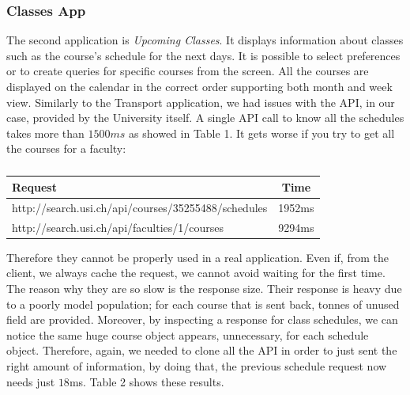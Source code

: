 \documentclass[]{usiinfbachelorproject}
\begin{document}
\subsubsection{Classes App}
The second application is \emph{Upcoming Classes}. It displays information about classes such as the course's schedule for the next days. It is possible to select preferences or to create queries for specific courses from the screen. All the courses are displayed on the calendar in the correct order supporting both month and week view.
Similarly to the Transport application, we had issues with the API, in our case, provided by the University itself. A single API call to know all the schedules takes more than $1500ms$ as showed in Table 1. It gets worse if you try to get all the courses for a faculty:
\begin{table}[h]
\centering
\begin{tabular}{|l|c|}
\hline
Request & Time \\\hline
http://search.usi.ch/api/courses/35255488/schedules & 1952ms \\
http://search.usi.ch/api/faculties/1/courses & 9294ms\\\hline
\end{tabular}
\caption{}
\label{table:usi_request}
\end{table}
Therefore they cannot be properly used in a real application. Even if, from the client, we always cache the request, we cannot avoid waiting for the first time. The reason why they are so slow is the response size. Their response is heavy due to a poorly model population; for each course that is sent back, tonnes of unused field are provided. Moreover, by inspecting a response for class schedules, we can notice the same huge course object appears, unnecessary, for each schedule object.
Therefore, again, we needed to clone all the API in order to just sent the right amount of information, by doing that, the previous schedule request now needs just $18$ms. Table 2 shows these results.
\end{document}
